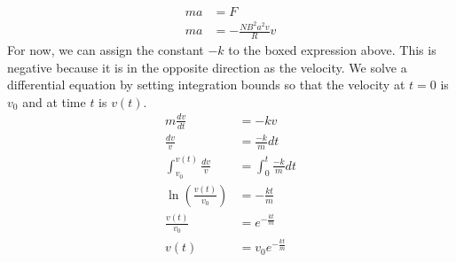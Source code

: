 \documentclass[12pt, titlepage]{article}
\begin{document}
\begin{align*}
    ma &= F \\
    ma &= \boxed{-\frac{NB^2a^2v}{R}}v
\end{align*}
For now, we can assign the constant $-k$ to the boxed expression above. This is negative because it is in the opposite direction as the velocity. We solve a differential equation by setting integration bounds so that the velocity at $t=0$ is $v_0$ and at time $t$ is $v(t)$.
\begin{align*}
    m\frac{dv}{dt} &= -kv \\
    \frac{dv}{v} &= \frac{-k}{m} dt \\
    \int_{v_0}^{v(t)} \frac{dv}{v} &= \int_{0}^{t} \frac{-k}{m}dt \\
    \ln (\frac{v(t)}{v_0})&=-\frac{kt}{m} \\
    \frac{v(t)}{v_0}&=e^{-\frac{kt}{m}} \\
    v(t) &= v_0e^{-\frac{kt}{m}}
\end{align*}
\end{document}

